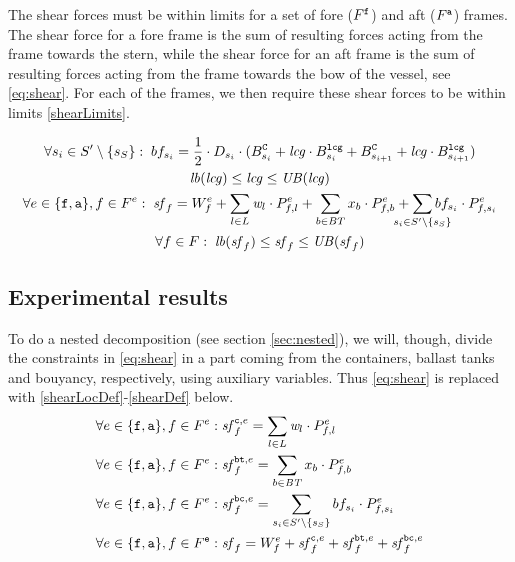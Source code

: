The shear forces must be within limits for a set of fore ($F^{\texttt{f}}$) and aft ($F^{\texttt{a}}$) frames. The shear force for a fore frame is the sum of resulting forces acting from the frame towards the stern, while the shear force for an aft frame is the sum of resulting forces acting from the frame towards the bow of the vessel, see \eqref{eq:shear}. For each of the frames, we then require these shear forces to be within limits \eqref{shearLimits}.

\begin{gather}
\forall s_i \in S'\setminus\{s_S\}:\;
\bonjean_{s_i} = \frac{1}{2}\cdot D_{s_i}\cdot(\Bonj^\trt{C}_{s_i} + \mi{lcg}\cdot \Bonj^\trt{lcg}_{s_i}	+ \Bonj^\trt{C}_{s_{i+1}} + \mi{lcg}\cdot \Bonj^\trt{lcg}_{s_{i+1}})
\label{bonjeanVarDef}\\
%
\mi{lb}(\mi{lcg}) \leq \mi{lcg} \leq \mi{UB}(\mi{lcg})
\label{lcgLim}\\
%
\forall {e}\in\{\trt{f},\trt{a}\}, f \in \Sec^{e}:\;
\shear_f = W^{e}_f+ \sum_{l\in L} \weight_l\cdot \Prop_{f,l}^{e} + \sum_{b \in BT} x_b\cdot \Prop^{e}_{f,b} 	+ \smashoperator{\sum_{s_i \in S'\setminus\{s_S\}}}\bonjean_{s_i}\cdot \Prop^{e}_{f,s_i}
\label{eq:shear}\\
%
\forall f \in \Sec:\;	\mi{lb}(\shear_f)\leq	\shear_f \leq \mi{UB}(\shear_f)
\label{shearLimits}
\end{gather}
%
\subsection{Experimental results}\label{sec:testResults}
To do a nested decomposition (see section \ref{sec:nested}), we will, though, divide the constraints in \eqref{eq:shear} in a part coming from the containers, ballast tanks and bouyancy, respectively, using auxiliary variables. Thus \eqref{eq:shear} is replaced with \eqref{shearLocDef}-\eqref{shearDef} below.
\begin{align}
\label{shearLocDef} 
\forall {e}\in\{\trt{f},\trt{a}\}, f \in \Sec^{e}:&\;
	\shear^{\trt{c},e}_f = \sum_{l \in L} \weight_l\cdot \Prop^{e}_{f,l}\\
%
\forall {e}\in\{\trt{f},\trt{a}\}, f \in \Sec^{e}:&\;
	\label{shearTanksDef}
	\shear^{\trt{bt},e}_f = \sum_{b \in \mi{BT}} x_b\cdot \Prop^{e}_{f,b} \\		
%
\forall {e}\in\{\trt{f},\trt{a}\}, f \in \Sec^{e}:&\;
	\label{shearBonjDef}
	\shear^{\trt{bc},e}_f = \sum_{s_i \in S'\setminus\{s_S\}} \bonjean_{s_i}\cdot \Prop^{e}_{f,s_i} \\
%
\forall {e}\in\{\trt{f},\trt{a}\}, f \in \Sec^\trt{e}:&\;
	\label{shearDef}
 	\shear_f = W^{e}_f +	\shear^{\trt{c},e}_f+ \shear^{\trt{bt},e}_f + \shear^{\trt{bc},e}_f
\end{align}

